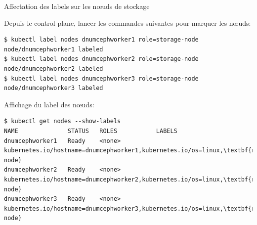 \begin{frame}[shrink=7,fragile]{Affectation des labels sur les n\oe{}uds de stockage}

   Depuis le control plane, lancer les commandes suivantes pour marquer les n\oe{}uds:
\begin{tiny}
\begin{Verbatim}[commandchars=\\\{\}]
$ kubectl label nodes dnumcephworker1 role=storage-node
node/dnumcephworker1 labeled
$ kubectl label nodes dnumcephworker2 role=storage-node
node/dnumcephworker2 labeled
$ kubectl label nodes dnumcephworker3 role=storage-node
node/dnumcephworker3 labeled
\end{Verbatim}
\end{tiny}

   Affichage du label des n\oe{}uds:
\begin{tiny}
\begin{Verbatim}[commandchars=\\\{\}]
$ kubectl get nodes --show-labels
NAME              STATUS   ROLES           LABELS
dnumcephworker1   Ready    <none>          kubernetes.io/hostname=dnumcephworker1,kubernetes.io/os=linux,\textbf{role=storage-node}
dnumcephworker2   Ready    <none>          kubernetes.io/hostname=dnumcephworker2,kubernetes.io/os=linux,\textbf{role=storage-node}
dnumcephworker3   Ready    <none>          kubernetes.io/hostname=dnumcephworker3,kubernetes.io/os=linux,\textbf{role=storage-node}
\end{Verbatim}
\end{tiny}
\end{frame}


